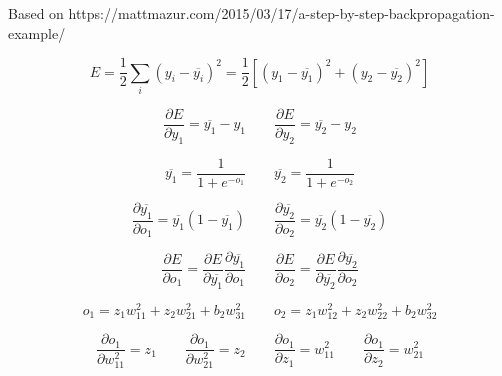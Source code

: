 \documentclass{article}
\begin{document}
    \title{}
    \author{}
    \date{}

    Based on https://mattmazur.com/2015/03/17/a-step-by-step-backpropagation-example/

    

    \begin{equation}
        E = \frac{1}{2} \sum_{i}{(y_i - \overline{y_i})^2} = 
        \frac{1}{2} \left[ (y_1 - \overline{y_1})^2 + (y_2 - \overline{y_2})^2 \right]
    \end{equation}

    \begin{equation*}
        \frac{\partial E}{\partial y_1} = \overline{y_1} - y_1
        \qquad %
        \frac{\partial E}{\partial y_2} = \overline{y_2} - y_2
    \end{equation*}

    \begin{equation}
        \overline{y_1} = \frac{1}{1+ e^{-o_1}}
        \qquad %
        \overline{y_2} = \frac{1}{1+ e^{-o_2}}
    \end{equation}

    \begin{equation*}
        \frac{\partial \overline{y_1}}{\partial o_1} = \overline{y_1} (1 - \overline{y_1})
        \qquad %
        \frac{\partial \overline{y_2}}{\partial o_2} = \overline{y_2} (1 - \overline{y_2})
    \end{equation*}

    \begin{equation*}
        \frac{\partial E}{\partial o_1} = 
        \frac{\partial E}{\partial \overline{y_1}} \frac{\partial \overline{y_1}}{\partial o_1}
        \qquad %
        \frac{\partial E}{\partial o_2} =
        \frac{\partial E}{\partial \overline{y_2}} \frac{\partial \overline{y_2}}{\partial o_2}
    \end{equation*}

    \begin{equation}
        o_1 =  z_1 w_{11}^2 + z_2 w_{21}^2 + b_2 w_{31}^2
        \qquad %
        o_2 =  z_1 w_{12}^2 + z_2 w_{22}^2 + b_2 w_{32}^2
    \end{equation}

    \begin{equation*}
        \frac{\partial o_1}{\partial w_{11}^2} = z_1
        \qquad %
        \frac{\partial o_1}{\partial w_{21}^2} = z_2
        \qquad %
        \frac{\partial o_1}{\partial z_1} = w_{11}^2
        \qquad %
        \frac{\partial o_1}{\partial z_2} = w_{21}^2
    \end{equation*}
\end{document}
